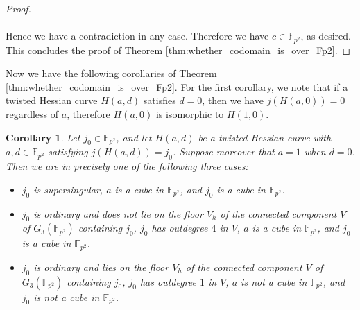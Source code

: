 \documentclass{article}
\newtheorem{corollary}[theorem]{Corollary}
\theoremstyle{definition}
\newcommand{\FF}{\mathbb{F}}
\begin{document}
\begin{proof}
\paragraph{}

Hence we have a contradiction in any case.
Therefore we have $c \in \FF_{p^2}$, as desired.
This concludes the proof of Theorem \ref{thm:whether_codomain_is_over_Fp2}.
\end{proof}

Now we have the following corollaries of Theorem \ref{thm:whether_codomain_is_over_Fp2}.
For the first corollary, we note that if a twisted Hessian curve $H(a,d)$ satisfies $d = 0$, then we have $j(H(a,0)) = 0$ regardless of $a$, therefore $H(a,0)$ is isomorphic to $H(1,0)$.

\begin{corollary}
\label{cor:when_j_invariant_is_a_cube}
Let $j_0 \in \FF_{p^2}$, and let $H(a,d)$ be a twisted Hessian curve with $a,d \in \FF_{p^2}$ satisfying $j(H(a,d)) = j_0$.
Suppose moreover that $a = 1$ when $d = 0$.
Then we are in precisely one of the following three cases:
\begin{itemize}
\item
$j_0$ is supersingular, $a$ is a cube in $\FF_{p^2}$, and $j_0$ is a cube in $\FF_{p^2}$.
\item
$j_0$ is ordinary and does not lie on the floor $V_h$ of the connected component $V$ of $G_3(\FF_{p^2})$ containing $j_0$, $j_0$ has outdegree $4$ in $V$, $a$ is a cube in $\FF_{p^2}$, and $j_0$ is a cube in $\FF_{p^2}$.
\item
$j_0$ is ordinary and lies on the floor $V_h$ of the connected component $V$ of $G_3(\FF_{p^2})$ containing $j_0$, $j_0$ has outdegree $1$ in $V$, $a$ is not a cube in $\FF_{p^2}$, and $j_0$ is not a cube in $\FF_{p^2}$.
\end{itemize}
\end{corollary}
\end{document}
